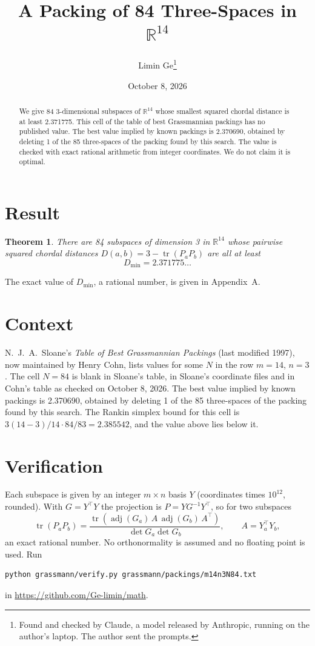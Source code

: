 \documentclass[11pt,a4paper]{article}
\title{A Packing of 84 Three-Spaces in $\mathbb{R}^{14}$}
\author{Limin Ge\thanks{Found and checked by Claude, a model released by Anthropic, running on the author's laptop. The author sent the prompts.}}
\date{October 8, 2026}
\newtheorem*{theorem}{Theorem}
\begin{document}
\maketitle
\begin{abstract}
We give 84 3-dimensional subspaces of $\mathbb{R}^{14}$ whose smallest squared chordal distance is at least 2.371775. This cell of the table of best Grassmannian packings has no published value. The best value implied by known packings is 2.370690, obtained by deleting 1 of the 85 three-spaces of the packing found by this search. The value is checked with exact rational arithmetic from integer coordinates. We do not claim it is optimal.
\end{abstract}

\section{Result}
\begin{theorem}
There are 84 subspaces of dimension 3 in $\mathbb{R}^{14}$ whose pairwise squared chordal distances $D(a,b) = 3 - \operatorname{tr}(P_aP_b)$ are all at least
\[ D_{\min} = 2.371775\ldots \]
\end{theorem}
The exact value of $D_{\min}$, a rational number, is given in Appendix~A.


\section{Context}
N.~J.~A.~Sloane's \emph{Table of Best Grassmannian Packings} (last modified 1997), now maintained by Henry Cohn, lists values for some $N$ in the row $m=14$, $n=3$. The cell $N=84$ is blank in Sloane's table, in Sloane's coordinate files and in Cohn's table as checked on October 8, 2026. The best value implied by known packings is 2.370690, obtained by deleting 1 of the 85 three-spaces of the packing found by this search. The Rankin simplex bound for this cell is $3(14-3)/14\cdot 84/83 = 2.385542$, and the value above lies below it.


\section{Verification}
Each subspace is given by an integer $m\times n$ basis $Y$ (coordinates times $10^{12}$, rounded). With $G=Y^\top Y$ the projection is $P=YG^{-1}Y^\top$, so for two subspaces
\[ \operatorname{tr}(P_aP_b)=\frac{\operatorname{tr}(\operatorname{adj}(G_a)\,A\,\operatorname{adj}(G_b)\,A^\top)}{\det G_a\det G_b},\qquad A=Y_a^\top Y_b, \]
an exact rational number. No orthonormality is assumed and no floating point is used. Run
\begin{verbatim}
python grassmann/verify.py grassmann/packings/m14n3N84.txt
\end{verbatim}
in \url{https://github.com/Ge-limin/math}.
\end{document}
